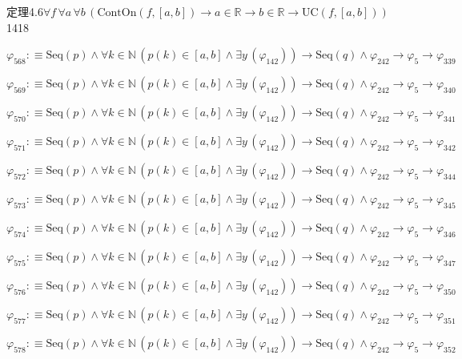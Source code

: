 \begin{fullproof}{定理4.6}{$\forall f\,\forall a\,\forall b\,(\mathrm{ContOn}(f,[a,b]) \to a \in \mathbb{R} \to b \in \mathbb{R} \to \mathrm{UC}(f,[a,b]))$}{1418}
\begin{abbrevlist}
\item $\varphi_{568} :\equiv \mathrm{Seq}(p) \land \forall k \in \mathbb{N}\,(p(k) \in [a,b] \land \exists y\,(\varphi_{142})) \to \mathrm{Seq}(q) \land \varphi_{242} \to \varphi_{5} \to \varphi_{339}$
\item $\varphi_{569} :\equiv \mathrm{Seq}(p) \land \forall k \in \mathbb{N}\,(p(k) \in [a,b] \land \exists y\,(\varphi_{142})) \to \mathrm{Seq}(q) \land \varphi_{242} \to \varphi_{5} \to \varphi_{340}$
\item $\varphi_{570} :\equiv \mathrm{Seq}(p) \land \forall k \in \mathbb{N}\,(p(k) \in [a,b] \land \exists y\,(\varphi_{142})) \to \mathrm{Seq}(q) \land \varphi_{242} \to \varphi_{5} \to \varphi_{341}$
\item $\varphi_{571} :\equiv \mathrm{Seq}(p) \land \forall k \in \mathbb{N}\,(p(k) \in [a,b] \land \exists y\,(\varphi_{142})) \to \mathrm{Seq}(q) \land \varphi_{242} \to \varphi_{5} \to \varphi_{342}$
\item $\varphi_{572} :\equiv \mathrm{Seq}(p) \land \forall k \in \mathbb{N}\,(p(k) \in [a,b] \land \exists y\,(\varphi_{142})) \to \mathrm{Seq}(q) \land \varphi_{242} \to \varphi_{5} \to \varphi_{344}$
\item $\varphi_{573} :\equiv \mathrm{Seq}(p) \land \forall k \in \mathbb{N}\,(p(k) \in [a,b] \land \exists y\,(\varphi_{142})) \to \mathrm{Seq}(q) \land \varphi_{242} \to \varphi_{5} \to \varphi_{345}$
\item $\varphi_{574} :\equiv \mathrm{Seq}(p) \land \forall k \in \mathbb{N}\,(p(k) \in [a,b] \land \exists y\,(\varphi_{142})) \to \mathrm{Seq}(q) \land \varphi_{242} \to \varphi_{5} \to \varphi_{346}$
\item $\varphi_{575} :\equiv \mathrm{Seq}(p) \land \forall k \in \mathbb{N}\,(p(k) \in [a,b] \land \exists y\,(\varphi_{142})) \to \mathrm{Seq}(q) \land \varphi_{242} \to \varphi_{5} \to \varphi_{347}$
\item $\varphi_{576} :\equiv \mathrm{Seq}(p) \land \forall k \in \mathbb{N}\,(p(k) \in [a,b] \land \exists y\,(\varphi_{142})) \to \mathrm{Seq}(q) \land \varphi_{242} \to \varphi_{5} \to \varphi_{350}$
\item $\varphi_{577} :\equiv \mathrm{Seq}(p) \land \forall k \in \mathbb{N}\,(p(k) \in [a,b] \land \exists y\,(\varphi_{142})) \to \mathrm{Seq}(q) \land \varphi_{242} \to \varphi_{5} \to \varphi_{351}$
\item $\varphi_{578} :\equiv \mathrm{Seq}(p) \land \forall k \in \mathbb{N}\,(p(k) \in [a,b] \land \exists y\,(\varphi_{142})) \to \mathrm{Seq}(q) \land \varphi_{242} \to \varphi_{5} \to \varphi_{352}$

\end{abbrevlist}
\end{fullproof}
